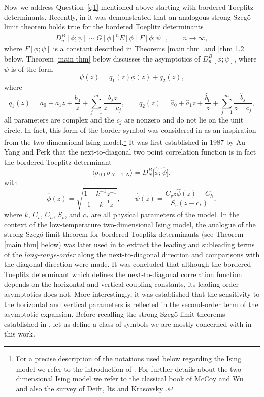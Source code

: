 \documentclass[pdftex]{sigma}
\numberwithin{equation}{section}
\begin{document}
Now we address Question~\ref{q1} mentioned above starting with bordered Toeplitz determinants. Recently, in \cite{BEGIL} it was demonstrated that an analogous strong Szeg\H{o} limit theorem holds true for the bordered Toeplitz determinants
\begin{gather*}%
	D^{B}_{n}[\phi; \psi] \sim G[\phi]^{n} E[\phi]\,F[\phi; \psi], \qquad n\to\infty,
\end{gather*}
where $F[\phi; \psi]$ is a constant described in Theorems \ref{main thm} and \ref{thm 1.2} below. Theorem \ref{main thm} below discusses the asymptotics of $D^{B}_{n}[\phi; \psi]$, where $\psi$ is of the form
\begin{equation}\label{general psi}
	\psi(z) = q_1(z) \phi(z) + q_2(z),
\end{equation}where
\begin{equation}\label{q1 q2}
	q_1(z) = a_0+a_1z+\frac{b_0}{z}+\sum^{m}_{j=1}\frac{b_j z}{z-c_j},\qquad q_2(z) = \hat{a}_0+\hat{a}_1z+\frac{\hat{b}_0}{z}+
	\sum_{j=1}^m \frac{\hat{b}_j}{z-c_j},
\end{equation}
all parameters are complex and the $c_j$ are nonzero and do not lie on the unit circle. In fact, this form of the border symbol was considered in \cite{BEGIL} as an inspiration from the two-dimensional Ising model.\footnote{For a precise description of the notations used below regarding the Ising model we refer to the introduction of \cite{BEGIL}. For further details about the two-dimensional Ising model we refer to the classical book of McCoy and Wu~\cite{McCoy-Wu} and also the survey of Deift, Its and Krasovsky \cite{DIK1}.} It was first established in 1987 by Au-Yang and Perk \cite{YP} that the next-to-diagonal two point correlation function is in fact the bordered Toeplitz determinant
\[%
	\langle \sigma_{0,0}\sigma_{N-1,N} \rangle = D^B_N\big[\widehat{\phi}; \widehat{\psi}\big],
\]
with
\begin{equation}\label{hat psi}
	\widehat{\phi}(z) = \sqrt{\frac{1-k^{-1}z^{-1}}{1-k^{-1}z}},\qquad	\widehat{\psi}(z)= \frac{C_v z\widehat{\phi}(z)+C_h}{S_v(z-c_*)},
\end{equation} where $k$, $C_v$, $C_h$, $S_v$, and $c_*$ are all physical parameters of the model. In the context of the low-temperature two-dimensional Ising model, the analogue of the strong Szeg\H{o} limit theorem for bordered Toeplitz determinants (see Theorem \ref{main thm} below) was later used in \cite{BEGIL} to extract the leading and subleading terms of the \textit{long-range-order} along the next-to-diagonal direction and comparisons with the diagonal direction were made. It was concluded that although the bordered Toeplitz determinant which defines the next-to-diagonal correlation function depends on the horizontal and vertical coupling constants, its leading order asymptotics
does not. More interestingly, it was established that the sensitivity to the horizontal and vertical parameters is reflected in the second-order term of the asymptotic expansion. Before recalling the strong Szeg\H{o} limit theorems established in \cite{BEGIL}, let us define a class of symbols we are mostly concerned with in this work.
\end{document}
